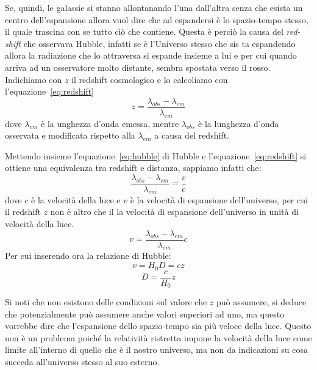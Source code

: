 Se, quindi, le galassie si stanno allontanando l'una dall'altra senza che esista un centro dell'espansione allora vuol dire che ad espandersi è lo spazio-tempo stesso, il quale trascina con se tutto ciò che contiene. Questa è perciò la causa del \textit{red-shift} che osservava Hubble, infatti se è l'Universo stesso che sis ta espandendo allora la radiazione che lo attraversa si espande insieme a lui e per cui quando arriva ad un osservatore molto distante, sembra spostata verso il rosso. Indichiamo con $z$ il redshift cosmologico e lo calcoliamo con l'equazione~\ref{eq:redshift}
\begin{equation}\label{eq:redshift}
    z = \frac{\lambda_{obs} - \lambda_{em}}{\lambda_{em}}
\end{equation}
dove $\lambda_{em}$ è la unghezza d'onda emessa, mentre $\lambda_{obs}$ è la lunghezza d'onda osservata e modificata rispetto alla $\lambda_{em}$ a causa del redshift.

Mettendo insieme l'equazione~\ref{eq:hubble} di Hubble e l'equazione~\ref{eq:redshift} si ottiene una equivalenza tra redshift e distanza, sappiamo infatti che:
\[
    \frac{\lambda_{obs} - \lambda_{em}}{\lambda_{em}} = \frac{v}{c}
\]
dove $c$ è la velocità della luce e $v$ è la velocità di espansione dell'universo, per cui il redshift $z$ non è altro che il la velocità di espansione dell'universo in unità di velocità della luce.
\[
    v = \frac{\lambda_{obs} - \lambda_{em}}{\lambda_{em}} c
\]
Per cui inserendo ora la relazione di Hubble:
\[
    v = H_0 D = c z
\]
\begin{equation}\label{eq:ditanza-redshift}
    D = \frac{c}{H_0}z
\end{equation}

Si noti che non esistono delle condizioni sul valore che $z$ può assumere, si deduce che potenzialmente può assumere anche valori superiori ad uno, ma questo vorrebbe dire che l'espansione dello spazio-tempo sia più veloce della luce. Questo non è un problema poiché la relatività ristretta impone la velocità della luce come limite all'interno di quello che è il nostro universo, ma non da indicazioni su cosa succeda all'universo stesso al suo esterno.